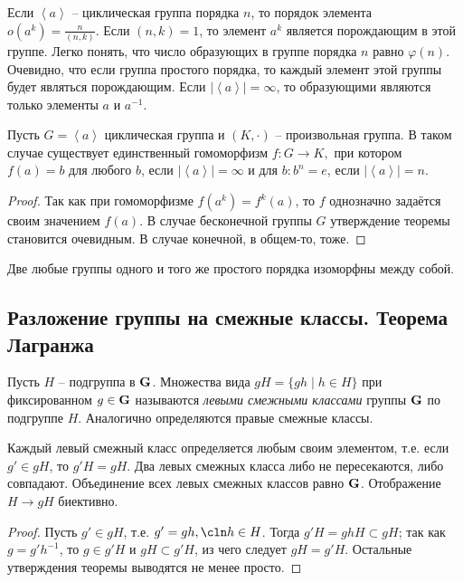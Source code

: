 Если $\left\langle a\right\rangle$ -- циклическая группа порядка $n$, то порядок элемента $o(a^k)=\frac{n}{(n,k)}$. Если $(n,k)=1$, то элемент $a^k$ является порождающим в этой группе. Легко понять, что число образующих в группе порядка $n$ равно $\varphi(n)$. Очевидно, что если группа простого порядка, то каждый элемент этой группы будет являться порождающим. Если $|\left\langle a\right\rangle|=\infty$, то образующими являются только элементы $a$ и $a^{-1}$.

\begin{theorem}
  Пусть $G=\left\langle a \right\rangle$ циклическая группа и $(K, \cdot)$ -- произвольная группа. В таком случае существует единственный гомоморфизм $f\colon G\to K,$ при котором $f(a)=b$ для любого $b$, если $|\left\langle a\right\rangle|=\infty$ и для $b\colon b^n=e$, если $|\left\langle a\right\rangle|=n$.
\end{theorem}
\begin{proof}
  Так как при гомоморфизме $f(a^k)=f^k(a)$, то $f$ однозначно задаётся своим значением $f(a)$. В случае бесконечной группы $G$ утверждение теоремы становится очевидным. В случае конечной, в общем-то, тоже.
\end{proof}

\begin{theorem}
  Две любые группы одного и того же простого порядка изоморфны между собой.
\end{theorem}

\subsection{Разложение группы на смежные классы. Теорема Лагранжа}

\begin{df}
  Пусть $H$ -- подгруппа в $\mathbf{G}$. Множества вида $gH = \{gh\mid h\in H\}$ при фиксированном $g\in\mathbf{G}$ называются \emph{левыми смежными классами} группы $\mathbf{G}$ по подгруппе $H$. Аналогично определяются правые смежные классы.
\end{df}

\begin{theorem}
  Каждый левый смежный класс определяется любым своим элементом, т.е. если $g'\in gH$, то $g'H=gH$. Два левых смежных класса либо не пересекаются, либо совпадают. Объединение всех левых смежных классов равно $\mathbf{G}$. Отображение $H\to gH$ биективно.
\end{theorem}
\begin{proof}
  Пусть $g'\in gH$, т.е. $g'=gh,\cln h\in H$. Тогда $g'H=ghH\subset gH$; так как $g=g'h^{-1}$, то $g\in g'H$ и $gH\subset g'H$, из чего следует $gH=g'H$. Остальные утверждения теоремы выводятся не менее просто.
\end{proof}

